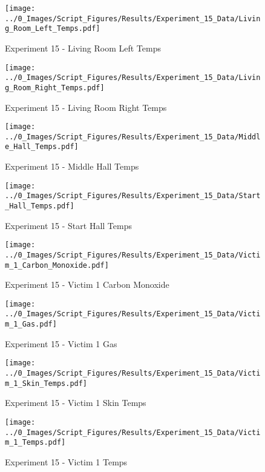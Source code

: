 	\begin{figure}[H]
		\centering
		\texttt{[image: ../0\_Images/Script\_Figures/Results/Experiment\_15\_Data/Living\_Room\_Left\_Temps.pdf]}
		\caption[]{Experiment 15 - Living Room Left Temps}
	\end{figure}
 
	\clearpage

	\begin{figure}[H]
		\centering
		\texttt{[image: ../0\_Images/Script\_Figures/Results/Experiment\_15\_Data/Living\_Room\_Right\_Temps.pdf]}
		\caption[]{Experiment 15 - Living Room Right Temps}
	\end{figure}
 

	\begin{figure}[H]
		\centering
		\texttt{[image: ../0\_Images/Script\_Figures/Results/Experiment\_15\_Data/Middle\_Hall\_Temps.pdf]}
		\caption[]{Experiment 15 - Middle Hall Temps}
	\end{figure}
 
	\clearpage

	\begin{figure}[H]
		\centering
		\texttt{[image: ../0\_Images/Script\_Figures/Results/Experiment\_15\_Data/Start\_Hall\_Temps.pdf]}
		\caption[]{Experiment 15 - Start Hall Temps}
	\end{figure}
 

	\begin{figure}[H]
		\centering
		\texttt{[image: ../0\_Images/Script\_Figures/Results/Experiment\_15\_Data/Victim\_1\_Carbon\_Monoxide.pdf]}
		\caption[]{Experiment 15 - Victim 1 Carbon Monoxide}
	\end{figure}
 
	\clearpage

	\begin{figure}[H]
		\centering
		\texttt{[image: ../0\_Images/Script\_Figures/Results/Experiment\_15\_Data/Victim\_1\_Gas.pdf]}
		\caption[]{Experiment 15 - Victim 1 Gas}
	\end{figure}
 

	\begin{figure}[H]
		\centering
		\texttt{[image: ../0\_Images/Script\_Figures/Results/Experiment\_15\_Data/Victim\_1\_Skin\_Temps.pdf]}
		\caption[]{Experiment 15 - Victim 1 Skin Temps}
	\end{figure}
 
	\clearpage

	\begin{figure}[H]
		\centering
		\texttt{[image: ../0\_Images/Script\_Figures/Results/Experiment\_15\_Data/Victim\_1\_Temps.pdf]}
		\caption[]{Experiment 15 - Victim 1 Temps}
	\end{figure}
 


